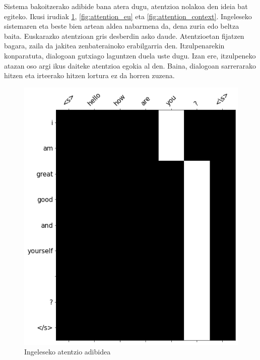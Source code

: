 \documentclass[11pt,a4paper]{article}
\begin{document}
Sistema bakoitzerako adibide bana atera dugu, atentzioa nolakoa den ideia bat egiteko. Ikusi irudiak \ref{fig:attention_en}, \ref{fig:attention_eu} eta \ref{fig:attention_context}. Ingeleseko sistemaren eta beste bien artean aldea nabarmena da, dena zuria edo beltza baita. Euskarazko atentzioan gris desberdin asko daude. Atentzioetan fijatzen bagara, zaila da jakitea zenbaterainoko erabilgarria den. Itzulpenarekin konparatuta, dialogoan gutxiago laguntzen duela uste dugu. Izan ere, itzulpeneko atazan oso argi ikus daiteke atentzioa egokia al den. Baina, dialogoan sarrerarako hitzen eta irteerako hitzen lortura ez da horren zuzena.

\begin{figure}[ht]
    \centering
    \includegraphics[width=\linewidth]{attention_en}
    \caption{Ingeleseko atentzio adibidea}
    \label{fig:attention_en}
\end{figure}
\end{document}
